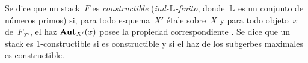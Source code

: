 Se dice que un stack~$F$ es \emph{constructible}
%
(\emph{\resp ind-$\mathbb L$-finito},
%
donde~$\mathbb L$ es un conjunto de números primos) si, para todo esquema~$X'$
étale sobre~$X$ y para todo objeto~$x$ de~$F_{X'}$, el haz
$\operatorname{\mathbf{Aut}}_{X'}(x)$ posee la propiedad correspondiente
\cite[VII 2.2.1]{XIII.2}. Se dice que un stack es $1$-constructible
%
si es constructible y si el haz de los subgerbes maximales es constructible.
